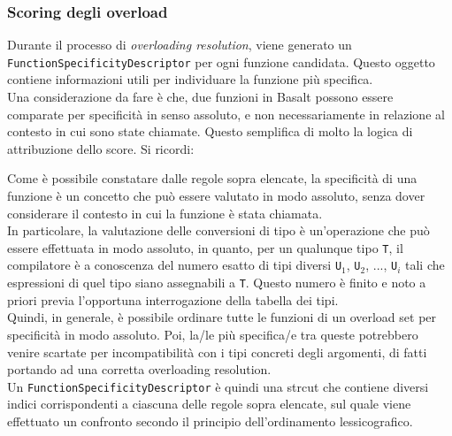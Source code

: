 \subsubsection{Scoring degli overload}
Durante il processo di \textit{overloading resolution}, viene generato un \texttt{FunctionSpecificityDescriptor}
per ogni funzione candidata. Questo oggetto contiene informazioni utili per individuare la funzione più specifica. \\

Una considerazione da fare è che, due funzioni in Basalt possono essere comparate per specificità in senso assoluto, 
e non necessariamente in relazione al contesto in cui sono state chiamate. Questo semplifica di molto la logica di 
attribuzione dello score. Si ricordi:



Come è possibile constatare dalle regole sopra elencate, la specificità di una funzione è un concetto che può essere
valutato in modo assoluto, senza dover considerare il contesto in cui la funzione è stata chiamata. \\

In particolare, la valutazione delle conversioni di tipo è un'operazione che può essere effettuata in modo assoluto, in quanto,
per un qualunque tipo \texttt{T}, il compilatore è a conoscenza del numero esatto di tipi diversi \texttt{U$_1$}, \texttt{U$_2$}, ..., \texttt{U$_i$}
tali che espressioni di quel tipo siano assegnabili a \texttt{T}. Questo numero è finito e noto a priori previa l'opportuna 
interrogazione della tabella dei tipi. \\

Quindi, in generale, è possibile ordinare tutte le funzioni di un overload set per specificità in modo assoluto. Poi, la/le più specifica/e tra 
queste potrebbero venire scartate per incompatibilità con i tipi concreti degli argomenti, di fatti portando ad una corretta overloading resolution. \\

Un \texttt{FunctionSpecificityDescriptor} è quindi una strcut che contiene diversi indici corrispondenti a ciascuna delle regole sopra elencate, 
sul quale viene effettuato un confronto secondo il principio dell'ordinamento lessicografico.